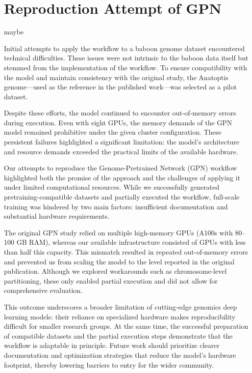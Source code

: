 \documentclass[
  a4paper,
  openany]{scrbook}
\begin{document}
\section{Reproduction Attempt of GPN}\label{reproduction-attempt-of-gpn}

maybe

Initial attempts to apply the workflow to a baboon genome dataset
encountered technical difficulties. These issues were not intrinsic to
the baboon data itself but stemmed from the implementation of the
workflow. To ensure compatibility with the model and maintain
consistency with the original study, the Anatoptis genome---used as the
reference in the published work---was selected as a pilot dataset.

Despite these efforts, the model continued to encounter out-of-memory
errors during execution. Even with eight GPUs, the memory demands of the
GPN model remained prohibitive under the given cluster configuration.
These persistent failures highlighted a significant limitation: the
model's architecture and resource demands exceeded the practical limits
of the available hardware.

Our attempts to reproduce the Genome-Pretrained Network (GPN) workflow
highlighted both the promise of the approach and the challenges of
applying it under limited computational resources. While we successfully
generated pretraining-compatible datasets and partially executed the
workflow, full-scale training was hindered by two main factors:
insufficient documentation and substantial hardware requirements.

The original GPN study relied on multiple high-memory GPUs (A100s with
80--100 GB RAM), whereas our available infrastructure consisted of GPUs
with less than half this capacity. This mismatch resulted in repeated
out-of-memory errors and prevented us from scaling the model to the
level reported in the original publication. Although we explored
workarounds such as chromosome-level partitioning, these only enabled
partial execution and did not allow for comprehensive evaluation.

This outcome underscores a broader limitation of cutting-edge genomics
deep learning models: their reliance on specialized hardware makes
reproducibility difficult for smaller research groups. At the same time,
the successful preparation of compatible datasets and the partial
execution steps demonstrate that the workflow is adaptable in principle.
Future work should prioritize clearer documentation and optimization
strategies that reduce the model's hardware footprint, thereby lowering
barriers to entry for the wider community.
\end{document}
